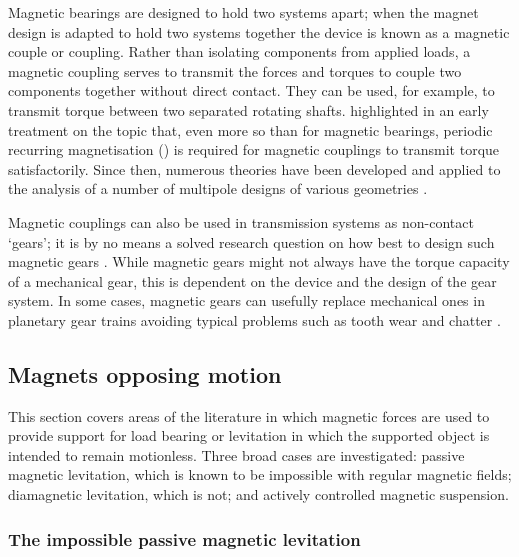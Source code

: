 \documentclass[11pt,a4paper]{memoir}
\begin{document}
Magnetic bearings are designed to hold two systems apart; when the magnet design is adapted to hold two systems together the device is known as a magnetic couple or coupling.
Rather than isolating components from applied loads, a magnetic coupling serves to transmit the forces and torques to couple two components together without direct contact.
They can be used, for example, to transmit torque between two separated rotating shafts.
\textcite{yonnet1981} highlighted in an early treatment on the topic that, even more so than for magnetic bearings, periodic recurring magnetisation () is required for magnetic couplings to transmit torque satisfactorily.
Since then, numerous theories have been developed and applied to the analysis of a number of multipole designs of various geometries \cite{charpentier1999-ietm-mar,charpentier1999-ietm-sep,charpentier2001-compel,chen2003,ravaud2009-coupling-3d,ravaud2010-ietm-coupling}.

Magnetic couplings can also be used in transmission systems as non-contact `gears'; it is by no means a solved research question on how best to design such magnetic gears
\cite{rens2010-ietia}.
While magnetic gears might not always have the torque capacity of a mechanical gear, this is dependent on the device and the design of the gear system.
In some cases, magnetic gears can usefully replace mechanical ones in planetary gear trains avoiding typical problems such as tooth wear and chatter
\cite{gouda2011-ietm}.


\subsection{Magnets opposing motion}

This section covers areas of the literature in which magnetic forces are used to provide support for load bearing or levitation in which the supported object is intended to remain motionless.
Three broad cases are investigated: passive magnetic levitation, which is known to be impossible with regular magnetic fields; diamagnetic levitation, which is not; and actively controlled magnetic suspension.

\subsubsection{The impossible passive magnetic levitation}
\end{document}
